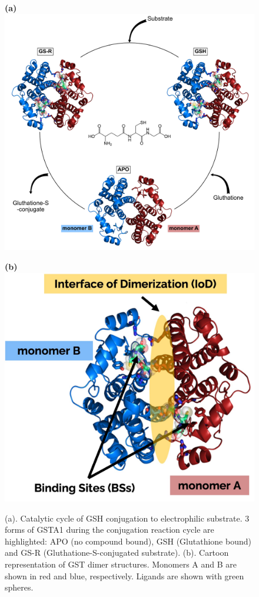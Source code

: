 \begin{figure}[b!]
	\begin{minipage}{.59\textwidth}
		\textbf{(a)}\\
		\includegraphics[width=.9\textwidth]{../figures/fig_1C_cycle.jpg}
	\end{minipage}
	\begin{minipage}{.4\textwidth}
		\textbf{(b)}\\
		\includegraphics[width=1\textwidth]{../figures/fig_GST_BS_IoD.jpg}
	\end{minipage}
	\caption{(a). Catalytic cycle of GSH conjugation to electrophilic substrate. 3 forms of GSTA1 during the conjugation reaction cycle are highlighted: APO (no compound bound), GSH (Glutathione bound) and GS-R (Gluthatione-S-conjugated substrate). (b). Cartoon representation of GST dimer structures. Monomers A and B are shown in red and blue, respectively. Ligands are shown with green spheres.}
	\label{FIG2}
\end{figure}

